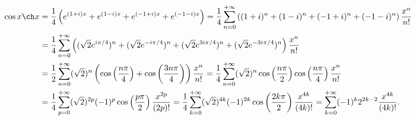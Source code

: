 {{\begin{align*}\ensuremath
\cos x\ch x&=\frac{1}{4}\left(e^{(1+i)x}+e^{(1-i)x}+e^{(-1+i)x}+e^{(-1-i)x}\right)=\frac{1}{4}\sum_{n=0}^{+\infty}\left((1+i)^n+(1-i)^n+(-1+i)^n+(-1-i)^n\right)\frac{x^n}{n!}\\
 &=\frac{1}{4}\sum_{n=0}^{+\infty}\left((\sqrt{2}e^{i\pi/4})^n+(\sqrt{2}e^{-i\pi/4})^n+(\sqrt{2}e^{3i\pi/4})^n+(\sqrt{2}e^{-3i\pi/4})^n\right)\frac{x^n}{n!}\\
  &=\frac{1}{2}\sum_{n=0}^{+\infty}(\sqrt{2})^n\left(\cos\left(\frac{n\pi}{4}\right)+\cos\left(\frac{3n\pi}{4}\right)\right)\frac{x^n}{n!}
=\frac{1}{4}\sum_{n=0}^{+\infty}(\sqrt{2})^n\cos\left(\frac{n\pi}{2}\right)\cos\left(\frac{n\pi}{4}\right)\frac{x^n}{n!}\\
 &=\frac{1}{4}\sum_{p=0}^{+\infty}(\sqrt{2})^{2p}(-1)^p\cos\left(\frac{p\pi}{2}\right)\frac{x^{2p}}{(2p)!}=\frac{1}{4}\sum_{k=0}^{+\infty}(\sqrt{2})^{4k}(-1)^{2k}\cos\left(\frac{2k\pi}{2}\right)\frac{x^{4k}}{(4k)!}=\sum_{k=0}^{+\infty}(-1)^k2^{2k-2}\frac{x^{4k}}{(4k)!}.
\end{align*}

\begin{center}
\end{center}
}
}
